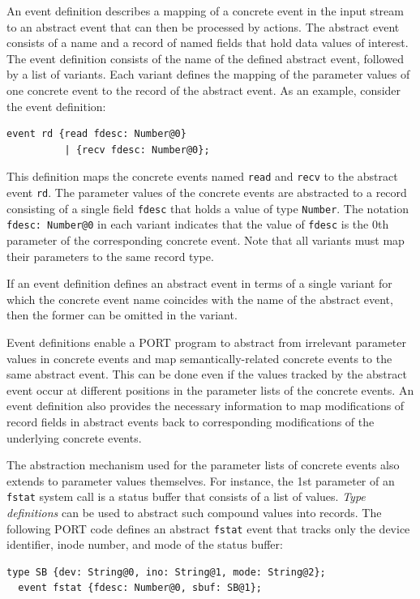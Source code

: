 An event definition describes a mapping of a concrete event in the input stream to an abstract event that can then be processed by actions. The abstract event consists of a name and a record of named fields that hold data values of interest. The event definition consists of the name of the defined abstract event, followed by a list of variants. Each variant defines the mapping of the parameter values of one concrete event to the record of the abstract event. As an example, consider the event definition:
\begin{lstlisting}[numbers=none,xleftmargin=0em,gobble=2,columns=strict]
  event rd {read fdesc: Number@0}
          | {recv fdesc: Number@0};
\end{lstlisting}
This definition maps the concrete events named \lstinline+read+ and \lstinline+recv+ to the abstract event \lstinline+rd+. The parameter values of the concrete events are abstracted to a record consisting of a single field \lstinline+fdesc+ that holds a value of type \lstinline+Number+. The notation \lstinline+fdesc: Number@0+ in each variant indicates that the value of \lstinline+fdesc+ is the 0th parameter of the corresponding concrete event. Note that all variants must map their parameters to the same record type.

If an event definition defines an abstract event in terms of a single variant for which the concrete event name coincides with the name of the abstract event, then the former can be omitted in the variant.

Event definitions enable a PORT program to abstract from irrelevant parameter values in concrete events and map semantically-related concrete events to the same abstract event. This can be done even if the values tracked by the abstract event occur at different positions in the parameter lists of the concrete events. An event definition also provides the necessary information to map modifications of record fields in abstract events back to corresponding modifications of the underlying concrete events.

The abstraction mechanism used for the parameter lists of concrete events also extends to parameter values themselves. For instance, the 1st parameter of an \lstinline+fstat+ system call is a status buffer that consists of a list of values. \emph{Type definitions} can be used to abstract such compound values into records. The following PORT code defines an abstract \lstinline+fstat+ event that tracks only the device identifier, inode number, and mode of the status buffer:
\begin{lstlisting}[numbers=none,xleftmargin=0em,gobble=2]
  type SB {dev: String@0, ino: String@1, mode: String@2};
  event fstat {fdesc: Number@0, sbuf: SB@1};
\end{lstlisting}

